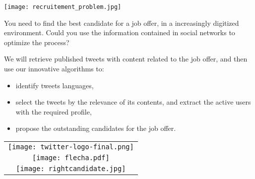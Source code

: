 
\cleardoublepage

\vspace{1cm}



\begin{minipage}{0.5\textwidth}
\texttt{[image: recruitement\_problem.jpg]}
\end{minipage} \hfill
\begin{minipage}{0.45\textwidth}
\medskip

\noindent You need to find the best candidate for a 
job offer, in a increasingly digitized environment.
Could you use the information contained in social networks
to optimize the process?
\end{minipage}
\vspace{1.5cm}


\begin{minipage}{0.7\textwidth}
\medskip

\noindent We will retrieve published tweets
with content related to the job offer, and then use our innovative
algorithms to:
\begin{itemize}
\item identify tweets languages,
\item select the tweets by the relevance of its contents,
and extract the active users with the required profile,
\item propose the outstanding candidates for the job offer.
\end{itemize}
\end{minipage}\hfill
\begin{minipage}{0.4\textwidth}
\begin{tabular}{c}
\texttt{[image: twitter-logo-final.png]}\\
\texttt{[image: flecha.pdf]}\\
\texttt{[image: rightcandidate.jpg]}
\end{tabular}
\end{minipage}
\vspace{1.5cm}


